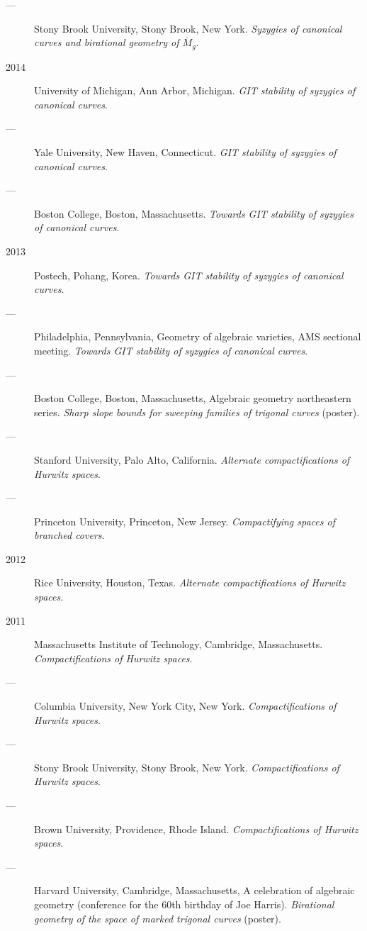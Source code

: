 \documentclass[11pt]{article}
\begin{document}
\begin{description}
\item[{---}] Stony Brook University, Stony Brook, New York. \emph{Syzygies of canonical curves and birational geometry of \(\overline M_g\)}.
\item[{2014}] University of Michigan, Ann Arbor, Michigan. \emph{GIT stability of syzygies of canonical curves}.
\item[{---}] Yale University, New Haven, Connecticut. \emph{GIT stability of syzygies of canonical curves}.
\item[{---}] Boston College, Boston, Massachusetts. \emph{Towards GIT stability of syzygies of canonical curves}.
\item[{2013}] Postech, Pohang, Korea. \emph{Towards GIT stability of syzygies of canonical curves}.
\item[{---}] Philadelphia, Pennsylvania, Geometry of algebraic varieties, AMS sectional meeting. \emph{Towards GIT stability of syzygies of canonical curves}.
\item[{---}] Boston College, Boston, Massachusetts, Algebraic geometry northeastern series. \emph{Sharp slope bounds for sweeping families of trigonal curves} (poster).
\item[{---}] Stanford University, Palo Alto, California. \emph{Alternate compactifications of Hurwitz spaces}.
\item[{---}] Princeton University, Princeton, New Jersey. \emph{Compactifying spaces of branched covers}.
\item[{2012}] Rice University, Houston, Texas. \emph{Alternate compactifications of Hurwitz spaces}.
\item[{2011}] Massachusetts Institute of Technology, Cambridge, Massachusetts. \emph{Compactifications of Hurwitz spaces}.
\item[{---}] Columbia University, New York City, New York. \emph{Compactifications of Hurwitz spaces}.
\item[{---}] Stony Brook University, Stony Brook, New York. \emph{Compactifications of Hurwitz spaces}.
\item[{---}] Brown University, Providence, Rhode Island. \emph{Compactifications of Hurwitz spaces}.
\item[{---}] Harvard University, Cambridge, Massachusetts, A celebration of algebraic geometry (conference for the 60th birthday of Joe Harris). \emph{Birational geometry of the space of marked trigonal curves} (poster).
\end{description}
\end{document}
